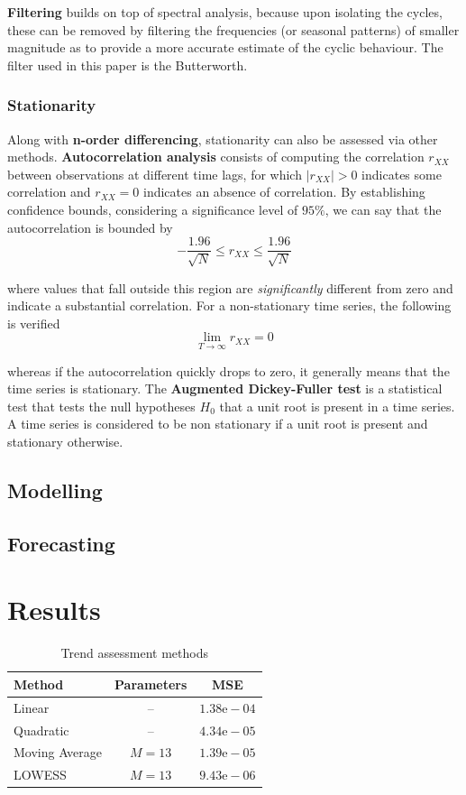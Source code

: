 \documentclass[conference]{IEEEtran}
\begin{document}
\textbf{Filtering} builds on top of spectral analysis, because upon isolating the cycles, these can be removed by filtering the frequencies (or seasonal patterns) of smaller magnitude as to provide a more accurate estimate of the cyclic behaviour. The filter used in this paper is the Butterworth.

\subsubsection{Stationarity}
Along with \textbf{n-order differencing}, stationarity can also be assessed via other methods. \textbf{Autocorrelation analysis} consists of computing the correlation $r_{XX}$ between observations at different time lags, for which $|r_{XX}|>0$ indicates some correlation and $r_{XX}=0$ indicates an absence of correlation. By establishing confidence bounds, considering a significance level of $95\%$, we can say that the autocorrelation is bounded by
\[
-\frac{1.96}{\sqrt{N}}\leq r_{XX}\leq\frac{1.96}{\sqrt{N}}
\]

where values that fall outside this region are \textit{significantly} different from zero and indicate a substantial correlation. For a non-stationary time series, the following is verified
\[
\lim_{T\to\infty}r_{XX}=0
\]

whereas if the autocorrelation quickly drops to zero, it generally means that the time series is stationary. The \textbf{Augmented Dickey-Fuller test} is a statistical test that tests the null hypotheses $H_0$ that a unit root is present in a time series. A time series is considered to be non stationary if a unit root is present and stationary otherwise.

\subsection{Modelling}
\subsection{Forecasting}
\section{Results}

\begin{table}[btp]
    \caption{Trend assessment methods}
    \centering
    \begin{tabular}{l|c|c}
         Method & Parameters & MSE \\
         \hline
         Linear & -- &  $1.38\text{e}-04$ \\
         Quadratic & -- & $4.34\text{e}-05$ \\
         Moving Average & $M=13$ & $1.39\text{e}-05$ \\
         LOWESS & $M=13$ & \cellcolor{green!25}$9.43\text{e}-06$ \\
    \end{tabular}
    \label{tab:trend}
\end{table}
\end{document}
